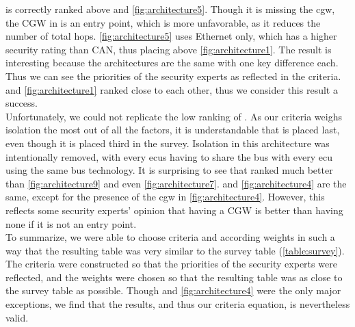  is correctly ranked above  and \ref{fig:architecture5}.
Though it is missing the \acrshort{cgw}, the CGW in  is an entry point, which is more unfavorable, as it reduces the number of total hops.
\ref{fig:architecture5} uses Ethernet only, which has a higher security rating than CAN, thus placing above \ref{fig:architecture1}.
The result is interesting because the architectures are the same with one key difference each. Thus we can see the priorities of the security experts
as reflected in the criteria.
 and \ref{fig:architecture1} ranked close to each other, thus we consider this result a success.\\

Unfortunately, we could not replicate the low ranking of .
As our criteria weighs isolation the most out of all the factors, it is understandable that  is placed last,
even though it is placed third in the survey.
Isolation in this architecture was intentionally removed, with every \acrshort{ecu}s having to share the bus with every \acrshort{ecu} using the same bus technology.
It is surprising to see that  ranked much better than \ref{fig:architecture9} and even \ref{fig:architecture7}.
 and \ref{fig:architecture4} are the same, except for the presence of the \acrshort{cgw} in \ref{fig:architecture4}.
However, this reflects some security experts' opinion that having a CGW is better than having none if it is not an entry point.\\

To summarize, we were able to choose criteria and according weights in such a way that the resulting table 
was very similar to the survey table (\ref{table:survey}).
The criteria were constructed so that the priorities of the security experts were reflected, 
and the weights were chosen so that the resulting table was as close to the survey table as possible.
Though  and \ref{fig:architecture4} were the only major exceptions, 
we find that the results, and thus our criteria equation, is nevertheless valid.\\


